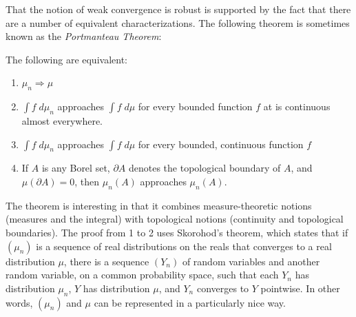 \documentclass{svjour3}
\begin{document}
That the notion of weak convergence is robust is supported by the fact that there are a number of equivalent characterizations. The following theorem is sometimes known as the \emph{Portmanteau Theorem}:
\begin{theorem}
The following are equivalent:
\begin{enumerate}
 \item $\mu_n \Rightarrow \mu$
 \item $\int f \; d\mu_n$ approaches $\int f \; d\mu$ for every bounded function $f$ at is continuous almost everywhere.
 \item $\int f \; d\mu_n$ approaches $\int f \; d\mu$ for every bounded, continuous function $f$
 \item If $A$ is any Borel set, $\partial A$ denotes the topological boundary of $A$, and $\mu(\partial A) = 0$, then $\mu_n(A)$ approaches $\mu_n(A)$. 
\end{enumerate}
\end{theorem}
The theorem is interesting in that it combines measure-theoretic notions (measures and the integral) with topological notions (continuity and topological boundaries). The proof from 1 to 2 uses Skorohod's theorem, which states that if $(\mu_n)$ is a sequence of real distributions on the reals that converges to a real distribution $\mu$, there is a sequence $(Y_n)$ of random variables and another random variable, on a common probability space, such that each $Y_n$ has distribution $\mu_n$, $Y$ has distribution $\mu$, and $Y_n$ converges to $Y$ pointwise. In other words, $(\mu_n)$ and $\mu$ can be represented in a particularly nice way. 
\end{document}
